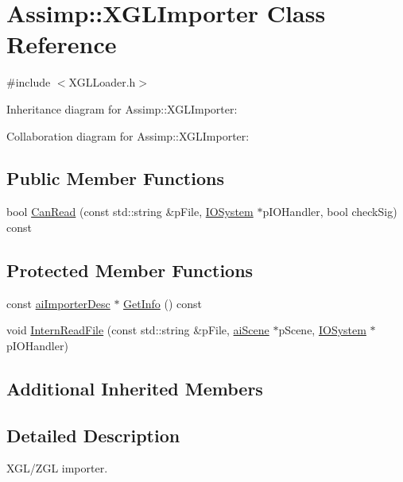 \hypertarget{class_assimp_1_1_x_g_l_importer}{\section{Assimp\+:\+:X\+G\+L\+Importer Class Reference}
\label{class_assimp_1_1_x_g_l_importer}
}


{\ttfamily \#include $<$X\+G\+L\+Loader.\+h$>$}



Inheritance diagram for Assimp\+:\+:X\+G\+L\+Importer\+:


Collaboration diagram for Assimp\+:\+:X\+G\+L\+Importer\+:
\subsection*{Public Member Functions}
\begin{DoxyCompactItemize}
\item 
bool \hyperlink{class_assimp_1_1_x_g_l_importer_a4d4b6f340370e574b6d4b67ab1312a17}{Can\+Read} (const std\+::string \&p\+File, \hyperlink{class_assimp_1_1_i_o_system}{I\+O\+System} $\ast$p\+I\+O\+Handler, bool check\+Sig) const 
\end{DoxyCompactItemize}
\subsection*{Protected Member Functions}
\begin{DoxyCompactItemize}
\item 
const \hyperlink{structai_importer_desc}{ai\+Importer\+Desc} $\ast$ \hyperlink{class_assimp_1_1_x_g_l_importer_ab35796bcc2e68598e0cb4206728c82b3}{Get\+Info} () const 
\item 
void \hyperlink{class_assimp_1_1_x_g_l_importer_a69abe132ca27c756c56f373af7f2d2f2}{Intern\+Read\+File} (const std\+::string \&p\+File, \hyperlink{structai_scene}{ai\+Scene} $\ast$p\+Scene, \hyperlink{class_assimp_1_1_i_o_system}{I\+O\+System} $\ast$p\+I\+O\+Handler)
\end{DoxyCompactItemize}
\subsection*{Additional Inherited Members}


\subsection{Detailed Description}
X\+G\+L/\+Z\+G\+L importer.

